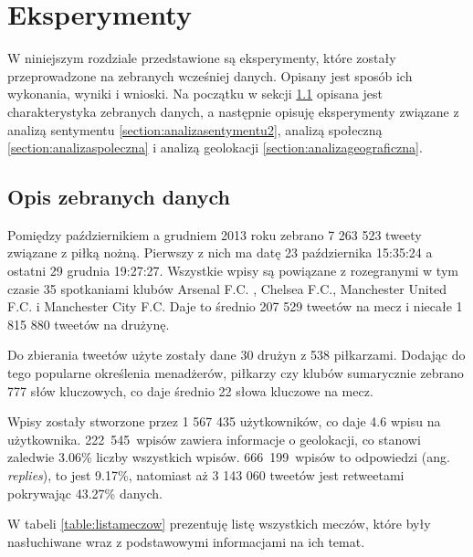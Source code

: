 \chapter{Eksperymenty}
\label{chapter:eksperymenty}
W niniejszym rozdziale przedstawione są eksperymenty, które zostały
przeprowadzone na zebranych wcześniej danych.
Opisany jest sposób ich wykonania, wyniki i wnioski.
Na początku w sekcji \ref{section:opisdanych} opisana jest charakterystyka
zebranych danych, a następnie opisuję eksperymenty związane z analizą sentymentu
\ref{section:analizasentymentu2}, analizą społeczną 
\ref{section:analizaspoleczna} i analizą geolokacji 
\ref{section:analizageograficzna}.














\section{Opis zebranych danych}
\label{section:opisdanych}

Pomiędzy październikiem a grudniem 2013 roku zebrano 7 263 523 tweety związane
z piłką nożną. Pierwszy z nich ma datę 23 października 15:35:24 a ostatni
29 grudnia 19:27:27. Wszystkie wpisy są powiązane z rozegranymi w tym czasie
35 spotkaniami klubów Arsenal F.C. , Chelsea F.C., Manchester United F.C. i
Manchester City F.C. Daje to średnio 207 529 tweetów na mecz i niecałe
1 815 880 tweetów na drużynę.

Do zbierania tweetów użyte zostały dane 30 drużyn z 538 piłkarzami.
Dodając do tego popularne określenia menadżerów, piłkarzy czy klubów sumarycznie
zebrano 777 słów kluczowych, co daje średnio 22 słowa kluczowe na mecz.

Wpisy zostały stworzone przez 1 567 435 użytkowników, co daje 4.6 
wpisu na użytkownika. \mbox{222 545 wpisów} zawiera informacje o geolokacji, co 
stanowi zaledwie 3.06\% liczby wszystkich wpisów. \mbox{666 199 wpisów} to 
odpowiedzi (ang. \textit{replies}), to jest 9.17\%, natomiast aż 3 143 060 
tweetów jest retweetami pokrywając 43.27\% danych.

W tabeli \ref{table:listameczow} prezentuję listę wszystkich meczów, które były 
nasłuchiwane wraz z podstawowymi informacjami na ich temat.



